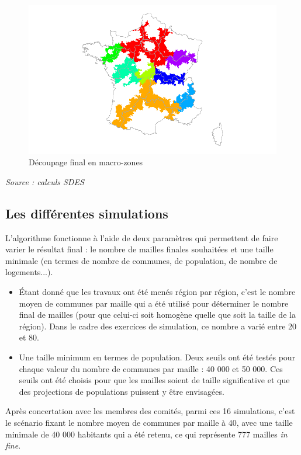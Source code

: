 \documentclass[12pt, a4paper]{article}
\begin{document}
\begin{figure}[H]
\caption{Découpage final en macro-zones}
\begin{center}
\includegraphics[scale=.7]{img/Decoupage.png}
\end{center}
\end{figure}
\emph{Source : calculs SDES}

\subsection{Les différentes simulations}

L'algorithme fonctionne à l'aide de deux paramètres qui permettent de faire varier le résultat final : le nombre de mailles finales souhaitées et une taille minimale (en termes de nombre de communes, de population, de nombre de logements...). 
\begin{itemize}
\item \'Etant donné que les travaux ont été menés région par région, c'est le nombre moyen de communes par maille qui a été utilisé pour déterminer le nombre final de mailles (pour que celui-ci soit homogène quelle que soit la taille de la région). Dans le cadre des exercices de simulation, ce nombre a varié entre 20 et 80.
\item Une taille minimum en termes de population. Deux seuils ont été testés pour chaque valeur du nombre de communes par maille : 40 000 et 50 000. Ces seuils ont été choisis pour que les mailles soient de taille significative et que des projections de populations puissent y être envisagées.
\end{itemize}

Après concertation avec les membres des comités, parmi ces 16 simulations, c'est le scénario fixant le nombre moyen de communes par maille à 40, avec une taille minimale de 40 000 habitants qui a été retenu, ce qui représente 777 mailles \emph{in fine}.
\end{document}
